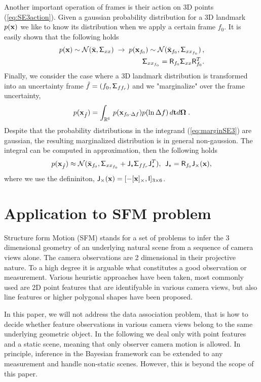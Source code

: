 \documentclass[conference]{IEEEtran}
\newcommand{\real}{\Bbb R}
\newcommand{\bfOmega}{\boldsymbol{\Omega}}
\newcommand{\sfSigma}[1]{\mathsf{\Sigma_\mathnormal{#1}}}
\newcommand{\beq}{\begin{equation}}
\newcommand{\eeq}{\end{equation}}
\begin{document}
Another important operation of frames is their action on 3D points (\ref{eq:SE3action}).
Given a gaussian probability distribution for a 3D landmark $p({\bf x})$ we like to know its
distribution when we apply a certain frame $f_0$. It is easily shown that the following holds
\beq
\begin{split}
    p({\bf x})   \sim {\cal N}(\bar{\bf x}, \sfSigma{xx}) \; \rightarrow \;
    p({\bf x}_{f_0}) \sim {\cal N}(\bar{\bf x}_{f_0}, \sfSigma{xx_{f_0}})\, , \\
    \sfSigma{xx_{f_0}}= {\sf R}_{f_0} \sfSigma{xx} {\sf R}_{f_0}^T.
    \label{eq:3Dptrafo}
\end{split}
\eeq
Finally, we consider the case where a 3D landmark distribution is transformed into an uncertainty frame
$\hat{f} = (f_0,\sfSigma{ff_r})$ and we "marginalize" over the frame uncertainty,
\beq
    p({\bf x}_{\hat{f}}) = \int_{\real^6} \, p({\bf x}_{f_0 \cdot \Delta f}) p( \ln \Delta f) \,
    d{\bf t}d\bfOmega\; .
    \label{eq:marginSE3}
\eeq
Despite that the probability distributions in the integrand (\ref{eq:marginSE3}) are gaussian, the resulting
marginalized distribution is in general non-gaussion. The integral can be computed in approximation, then
the following holds
\beq
    p({\bf x}_{\hat{f}}) \approx  {\cal N}(\bar{\bf x}_{f_0}, \sfSigma{xx_{f_0}} +
    {\sf J}_\star \sfSigma{ff_r} {\sf J}_\star^T), \;\,
    {\sf J}_\star = {\sf R}_{f_0} {\sf J_\times}({\bf x}), \label{eq:SE3approxmargin}
\eeq
where we use the defininiton, ${\sf J_\times}({\bf x}) = [-[{\bf x}]_\times, {\sf I}]_{3\times6}$.

\section{Application to SFM problem}

Structure form Motion (SFM) stands for a set of problems to infer the 3 dimensional
geometry of an underlying natural scene from a sequence of camera views alone.
The camera observations are 2 dimensional in their projective nature. To a high degree it is
arguable what constitutes a good observation or measurement. Various heuristic approaches have
been taken, most commonly used are 2D point features that are identifyable in various camera views,
but also line features or higher polygonal shapes have been proposed.

In this paper, we will not address the data association problem, that is how to decide whether
feature observations in various camera views belong to the same underlying geometric object. 
In the following we deal only with point features and a static scene, meaning that only observer camera
motion is allowed. In principle, inference in the Bayesian framework can be extended to
any measurement and handle non-static scenes. However, this is beyond the scope of this paper.
\end{document}
